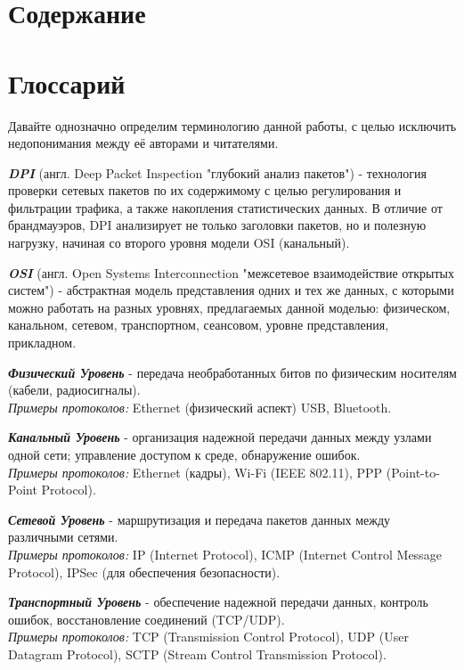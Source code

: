 \documentclass[utf8,14pt,a4paper,oneside,russian]{book}
\makeatletter
\renewcommand{\tableofcontents}{\section{Содержание}\markboth{Содержание}{}\@starttoc{toc}\newpage}
\makeatother
\begin{document}
\tableofcontents



\newpage
\section{Глоссарий}

Давайте однозначно определим терминологию данной работы, с целью исключить недопонимания между
её авторами и читателями.

\textbf{\textit{DPI}} (англ. Deep Packet Inspection "глубокий анализ пакетов") - технология проверки сетевых пакетов по их содержимому
с целью регулирования и фильтрации трафика, а также накопления статистических данных. В отличие от брандмауэров, DPI
анализирует не только заголовки пакетов, но и полезную нагрузку, начиная со второго уровня модели OSI (канальный).

\textbf{\textit{OSI}} (англ. Open Systems Interconnection "межсетевое взаимодействие открытых систем") - абстрактная модель представления
одних и тех же данных, с которыми можно работать на разных уровнях, предлагаемых данной моделью: физическом, канальном,
сетевом, транспортном, сеансовом, уровне представления, прикладном.

\textbf{\textit{Физический Уровень}} - передача необработанных битов по физическим носителям (кабели, радиосигналы).\\
\textit{Примеры протоколов:} Ethernet (физический аспект) USB, Bluetooth.

\textbf{\textit{Канальный Уровень}} - организация надежной передачи данных между узлами одной сети; управление доступом к среде,
обнаружение ошибок.\\
\textit{Примеры протоколов:} Ethernet (кадры), Wi-Fi (IEEE 802.11), PPP (Point-to-Point Protocol).

\textbf{\textit{Сетевой Уровень}} - маршрутизация и передача пакетов данных между различными сетями.\\
\textit{Примеры протоколов:} IP (Internet Protocol), ICMP (Internet Control Message Protocol), IPSec (для обеспечения безопасности).

\textbf{\textit{Транспортный Уровень}} - обеспечение надежной передачи данных, контроль ошибок, восстановление соединений (TCP/UDP).\\
\textit{Примеры протоколов:} TCP (Transmission Control Protocol), UDP (User Datagram Protocol), SCTP (Stream Control Transmission Protocol).
\end{document}
